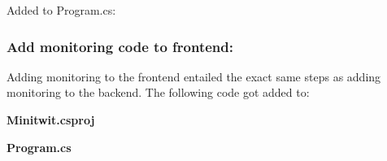 
Added to Program.cs:



\subsubsection{Add monitoring code to frontend:}
\label{log:add-monitoring-code-to-frontend}

Adding monitoring to the frontend entailed the exact same steps as
adding monitoring to the backend. The following code got added to:

\textbf{Minitwit.csproj}


\textbf{Program.cs}


